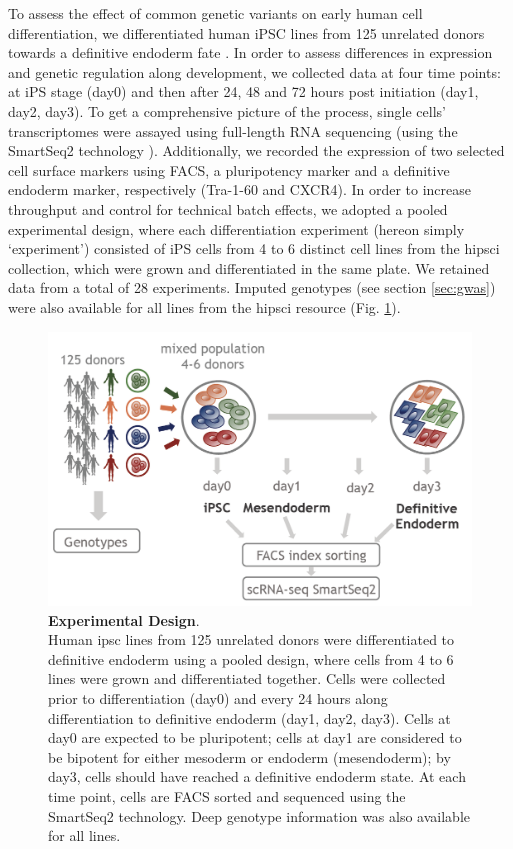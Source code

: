 To assess the effect of common genetic variants on early human cell differentiation, we differentiated human iPSC lines from 125 unrelated donors towards a definitive endoderm fate \cite{hannan2013production}.
In order to assess differences in expression and genetic regulation along development, we collected data at four 
time points: at iPS stage (day0) and then after 24, 48 and 72 hours post initiation (day1, day2, day3).
To get a comprehensive picture of the process, single cells' transcriptomes were assayed using full-length RNA sequencing (using the SmartSeq2 technology \cite{picelli2013smart}).
Additionally, we recorded the expression of two selected cell surface markers using FACS, a pluripotency marker and a definitive endoderm marker, respectively (Tra-1-60 and CXCR4).
In order to increase throughput and control for technical batch effects, we adopted a pooled experimental design, where each differentiation experiment (hereon simply `experiment') consisted of iPS cells from 4 to 6 distinct cell lines from the \gls{hipsci} collection, which were grown and differentiated in the same plate.
We retained data from a total of 28 experiments.
Imputed genotypes (see section \ref{sec:gwas}) were also available for all lines from the \gls{hipsci} resource (Fig. \ref{fig:endodiff_experimental_design}).

\begin{figure}[h]
\centering
\includegraphics[width=12cm]{Chapter4/Fig/endodiff_experimental_design.png}
\caption[Experimental Design]{\textbf{Experimental Design}.\\
Human \gls{ipsc} lines from 125 unrelated donors were differentiated to definitive endoderm using a pooled design, where cells from 4 to 6 lines were grown and differentiated together.
Cells were collected prior to differentiation (day0) and every 24 hours along differentiation to definitive endoderm (day1, day2, day3).
Cells at day0 are expected to be pluripotent; cells at day1 are considered to be bipotent for either mesoderm or endoderm (mesendoderm); by day3, cells should have reached a definitive endoderm state.
At each time point, cells are FACS sorted and sequenced using the SmartSeq2 technology.
Deep genotype information was also available for all lines.}
\label{fig:endodiff_experimental_design}
\end{figure}

